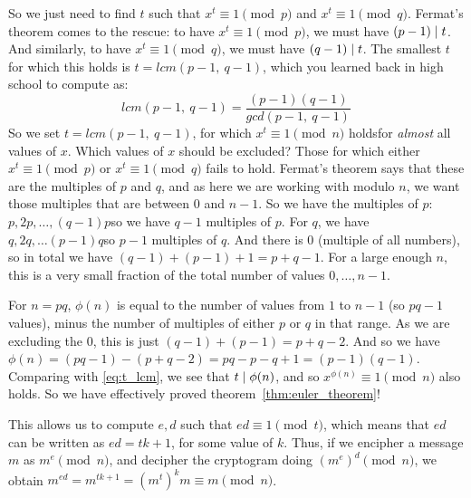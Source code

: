   So we just need to find $t$ such that $x^t \equiv 1 \pmod{p}$ and $x^t \equiv 1 \pmod{q}$. Fermat's theorem comes to the rescue: to have $x^t \equiv 1 \pmod{p}$, we must have $(p-1)\mathrel{|} t$. And similarly, to have $x^t \equiv 1 \pmod{q}$, we must have $(q-1)\mathrel{|} t$. The smallest $t$ for which this holds is $t = lcm(p-1,\ q-1)$, which you learned back in high school to compute as:
  \begin{equation}
    \label{eq:t_lcm}
    lcm(p-1,\ q-1) = \frac{(p-1)(q-1)}{gcd(p-1,\ q-1)}
  \end{equation}
  So we set $t = lcm(p-1,\ q-1)$, for which $x^t\equiv 1 \pmod{n}$ holds\emd for \emph{almost} all values of $x$. Which values of $x$ should be excluded? Those for which either $x^t \equiv 1 \pmod{p}$ or $x^t \equiv 1 \pmod{q}$ fails to hold. Fermat's theorem says that these are the multiples of $p$ and $q$, and as here we are working with modulo $n$, we want those multiples that are between $0$ and $n-1$. So we have the multiples of $p$: $p, 2p, \dots, (q-1)p$\emd so we have $q-1$ multiples of $p$. For $q$, we have $q, 2q, \dots (p-1)q$\emd so $p-1$ multiples of $q$. And there is $0$ (multiple of all numbers), so in total we have $(q-1) + (p-1) + 1 = p+q-1$. For a large enough $n$, this is a very small fraction of the total number of values $0, \dots, n-1$.
  \begin{remark}
    \label{rem:n_pq_totient}
    For $n=pq$, $\phi(n)$ is equal to the number of values from $1$ to $n-1$ (so $pq-1$ values), minus the number of multiples of either $p$ or $q$ in that range. As we are excluding the $0$, this is just $(q-1) + (p-1) = p +q - 2$. And so we have $\phi(n) = (pq - 1) - (p + q -2) = pq - p - q + 1 = (p-1)(q - 1)$. Comparing with \eqref{eq:t_lcm}, we see that $t\mathrel{|} \phi(n)$, and so $x^{\phi(n)} \equiv 1\pmod{n}$ also holds. So we have effectively proved theorem~\ref{thm:euler_theorem}!
  \end{remark}

  \medskip

   This allows us to compute $e, d$ such that $ed \equiv 1 \pmod{t}$, which means that $ed$ can be written as $ed = tk + 1$, for some value of $k$. Thus, if we encipher a message $m$ as $m^e \pmod{n}$, and decipher the cryptogram doing $(m^{e})^d \pmod{n}$, we obtain $m^{ed} = m^{tk +1} = (m^t)^k m \equiv m\pmod{n}$.

